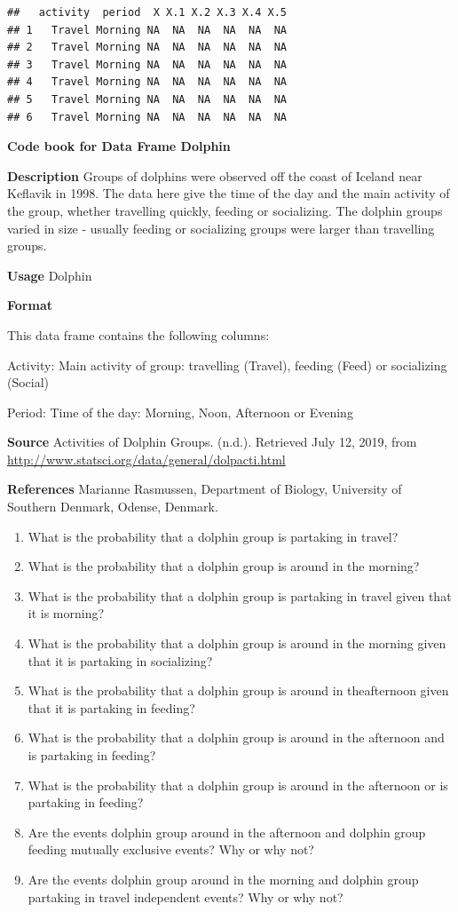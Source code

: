 \documentclass[]{book}
\providecommand{\tightlist}{%
  \setlength{\itemsep}{0pt}\setlength{\parskip}{0pt}}
\begin{document}
\begin{verbatim}
##   activity  period  X X.1 X.2 X.3 X.4 X.5
## 1   Travel Morning NA  NA  NA  NA  NA  NA
## 2   Travel Morning NA  NA  NA  NA  NA  NA
## 3   Travel Morning NA  NA  NA  NA  NA  NA
## 4   Travel Morning NA  NA  NA  NA  NA  NA
## 5   Travel Morning NA  NA  NA  NA  NA  NA
## 6   Travel Morning NA  NA  NA  NA  NA  NA
\end{verbatim}

\textbf{Code book for Data Frame Dolphin}

\textbf{Description}
Groups of dolphins were observed off the coast of Iceland near Keflavik in 1998. The data here give the time of the day and the main activity of the group, whether travelling quickly, feeding or socializing. The dolphin groups varied in size - usually feeding or socializing groups were larger than travelling groups.

\textbf{Usage}
Dolphin

\textbf{Format}

This data frame contains the following columns:

Activity: Main activity of group: travelling (Travel), feeding (Feed) or socializing (Social)

Period: Time of the day: Morning, Noon, Afternoon or Evening

\textbf{Source}
Activities of Dolphin Groups. (n.d.). Retrieved July 12, 2019, from \url{http://www.statsci.org/data/general/dolpacti.html}

\textbf{References}
Marianne Rasmussen, Department of Biology, University of Southern Denmark, Odense, Denmark.

\begin{enumerate}
\def\labelenumi{\alph{enumi}.}
\tightlist
\item
  What is the probability that a dolphin group is partaking in travel?
\item
  What is the probability that a dolphin group is around in the morning?
\item
  What is the probability that a dolphin group is partaking in travel given that it is morning?
\item
  What is the probability that a dolphin group is around in the morning given that it is partaking in socializing?
\item
  What is the probability that a dolphin group is around in theafternoon given that it is partaking in feeding?
\item
  What is the probability that a dolphin group is around in the afternoon and is partaking in feeding?
\item
  What is the probability that a dolphin group is around in the afternoon or is partaking in feeding?
\item
  Are the events dolphin group around in the afternoon and dolphin group feeding mutually exclusive events? Why or why not?
\item
  Are the events dolphin group around in the morning and dolphin group partaking in travel independent events? Why or why not?
\end{enumerate}
\end{document}
